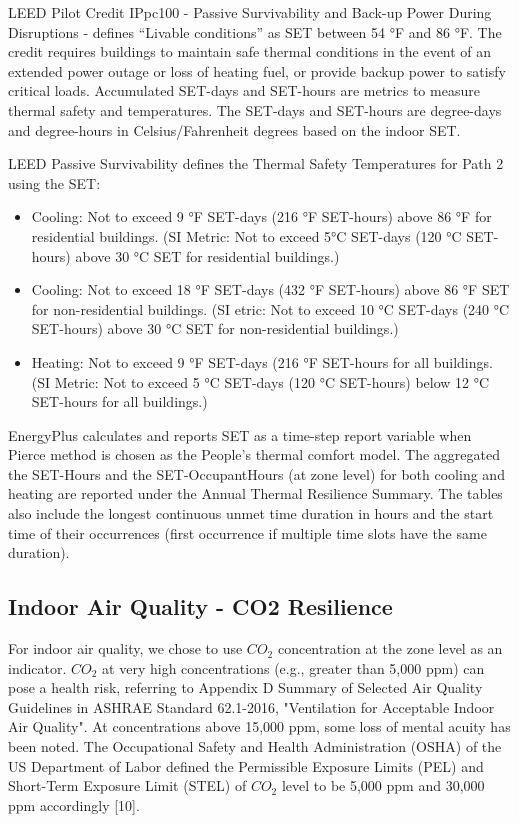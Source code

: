 LEED Pilot Credit IPpc100 - Passive Survivability and Back-up Power During Disruptions - defines “Livable conditions” as SET between 54 °F and 86 °F. The credit requires buildings to maintain safe thermal conditions in the event of an extended power outage or loss of heating fuel, or provide backup power to satisfy critical loads. Accumulated SET-days and SET-hours are metrics to measure thermal safety and temperatures. The SET-days and SET-hours are degree-days and degree-hours in Celsius/Fahrenheit degrees based on the indoor SET.

LEED Passive Survivability defines the Thermal Safety Temperatures for Path 2 using the SET:

\begin{itemize}
\item Cooling: Not to exceed 9 °F SET-days (216 °F SET-hours) above 86 °F for residential buildings. (SI Metric: Not to exceed 5°C SET-days (120 °C SET-hours) above 30 °C SET for residential buildings.)
\item Cooling: Not to exceed 18 °F SET-days (432 °F SET-hours) above 86 °F SET for non-residential buildings. (SI etric: Not to exceed 10 °C SET-days (240 °C SET-hours) above 30 °C SET for non-residential buildings.)
\item Heating: Not to exceed 9 °F SET-days (216 °F SET-hours for all buildings. (SI Metric: Not to exceed 5 °C SET-days (120 °C SET-hours) below 12 °C SET-hours for all buildings.)
\end{itemize}

EnergyPlus calculates and reports SET as a time-step report variable when Pierce method is chosen as the People's thermal comfort model. The aggregated the SET-Hours and the SET-OccupantHours (at zone level) for both cooling and heating are reported under the Annual Thermal Resilience Summary. The tables also include the longest continuous unmet time duration in hours and the start time of their occurrences (first occurrence if multiple time slots have the same duration).


\subsection{Indoor Air Quality - CO2 Resilience}\label{indoor-air-quality-resilience}

For indoor air quality, we chose to use $CO_2$ concentration at the zone level as an indicator. $CO_2$ at very high concentrations (e.g., greater than 5,000 ppm) can pose a health risk, referring to Appendix D Summary of Selected Air Quality Guidelines in ASHRAE Standard 62.1-2016, "Ventilation for Acceptable Indoor Air Quality". At concentrations above 15,000 ppm, some loss of mental acuity has been noted. The Occupational Safety and Health Administration (OSHA) of the US Department of Labor defined the Permissible Exposure Limits (PEL) and Short-Term Exposure Limit (STEL) of $CO_2$ level to be 5,000 ppm and 30,000 ppm accordingly [10].

